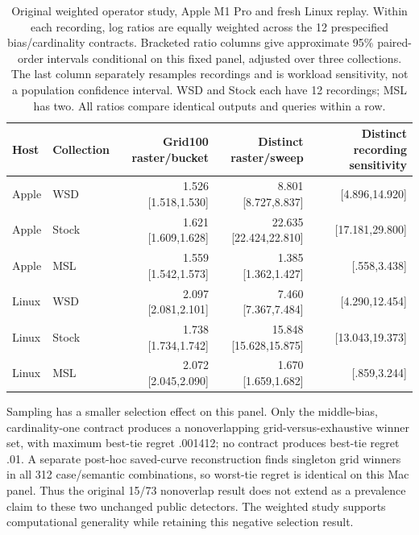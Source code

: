 \begin{table}[t]\centering\small
\begin{tabular}{llrrr}\toprule
Host & Collection & Grid100 raster/bucket & Distinct raster/sweep & Distinct recording sensitivity\\\midrule
Apple & WSD & 1.526 [1.518,1.530] & 8.801 [8.727,8.837] & [4.896,14.920]\\
Apple & Stock & 1.621 [1.609,1.628] & 22.635 [22.424,22.810] & [17.181,29.800]\\
Apple & MSL & 1.559 [1.542,1.573] & 1.385 [1.362,1.427] & [.558,3.438]\\
Linux & WSD & 2.097 [2.081,2.101] & 7.460 [7.367,7.484] & [4.290,12.454]\\
Linux & Stock & 1.738 [1.734,1.742] & 15.848 [15.628,15.875] & [13.043,19.373]\\
Linux & MSL & 2.072 [2.045,2.090] & 1.670 [1.659,1.682] & [.859,3.244]\\
\bottomrule\end{tabular}
\caption{Original weighted operator study, Apple M1 Pro and fresh Linux replay.
Within each recording,
log ratios are equally weighted across the 12 prespecified bias/cardinality
contracts. Bracketed ratio columns give approximate 95\% paired-order intervals
conditional on this fixed panel, adjusted over three collections. The last
column separately resamples recordings and is workload sensitivity, not a
population confidence interval. WSD and Stock each have 12 recordings; MSL has
two. All ratios compare identical outputs and queries within a row.}
\label{tab:weighted-new}\end{table}

Sampling has a smaller selection effect on this panel. Only the middle-bias,
cardinality-one contract produces a nonoverlapping grid-versus-exhaustive
winner set, with maximum best-tie regret .001412; no contract produces
best-tie regret .01. A separate post-hoc saved-curve reconstruction finds
singleton grid winners in all 312 case/semantic combinations, so worst-tie
regret is identical on this Mac panel.
Thus the original 15/73 nonoverlap result does not extend as a prevalence
claim to these two unchanged public detectors. The weighted study supports
computational generality while retaining this negative selection result.

